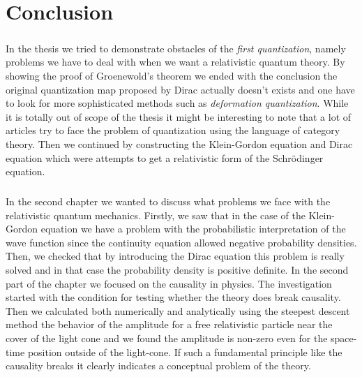 \chapter*{Conclusion}

\paragraph{} In the thesis we tried to demonstrate obstacles of the \textit{first quantization}, namely
problems we have to deal with when we want a relativistic quantum theory. By showing the proof of Groenewold's theorem
we ended with the conclusion the original quantization map proposed by Dirac actually doesn't exists and one have
to look for more sophisticated methods such as \textit{deformation quantization}. While it is totally out of scope 
of the thesis it might be interesting to note that a lot of articles try to face the problem of quantization using
the language of category theory. Then we continued by constructing the Klein-Gordon equation and Dirac equation
which were attempts to get a relativistic form of the Schrödinger equation.

\paragraph{} In the second chapter we wanted to discuss what problems we face with the relativistic quantum mechanics.
Firstly, we saw that in the case of the Klein-Gordon equation we have a problem with the probabilistic 
interpretation of the wave function since the continuity equation allowed negative probability densities.
Then, we checked that by introducing the Dirac equation this problem is really solved and in that case 
the probability density is positive definite. In the second part of the chapter we focused on the
causality in physics. The investigation started with the condition for testing whether the theory does
break causality. Then we calculated both numerically and analytically using the steepest descent method
the behavior of the amplitude for a free relativistic particle near the cover of the light cone and we
found the amplitude is non-zero even for the space-time position outside of the light-cone. If such a fundamental
principle like the causality breaks it clearly indicates a conceptual problem of the theory.


